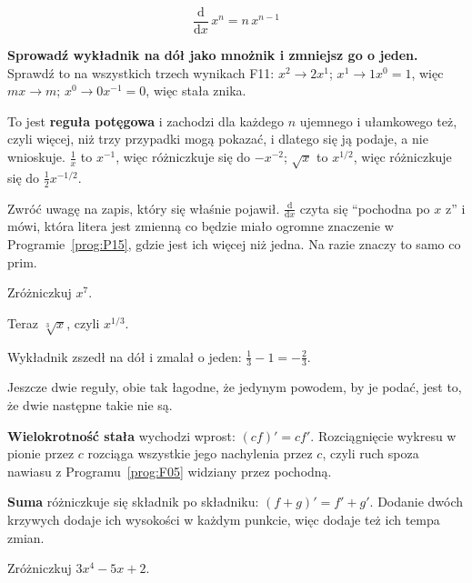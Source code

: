 \begin{fr}
\begin{ansblock}
\[ \frac{\mathrm{d}}{\mathrm{d}x}\,x^{n} = n\,x^{n-1} \]
\end{ansblock}

\textbf{Sprowadź wykładnik na dół jako mnożnik i zmniejsz go o jeden.}
Sprawdź to na wszystkich trzech wynikach F11: $x^{2} \to 2x^{1}$;
$x^{1} \to 1x^{0} = 1$, więc $mx \to m$; $x^{0} \to 0x^{-1} = 0$, więc stała
znika.

To jest \textbf{reguła potęgowa} i zachodzi dla każdego $n$ \dash{} ujemnego i
ułamkowego też, czyli więcej, niż trzy przypadki mogą pokazać, i dlatego się
ją podaje, a nie wnioskuje. $\frac{1}{x}$ to $x^{-1}$, więc różniczkuje się do
$-x^{-2}$; $\sqrt{x}$ to $x^{1/2}$, więc różniczkuje się do
$\frac{1}{2}x^{-1/2}$.

Zwróć uwagę na zapis, który się właśnie pojawił.
$\frac{\mathrm{d}}{\mathrm{d}x}$ czyta się \enquote{pochodna po $x$ z} i mówi,
która litera jest zmienną \dash{} co będzie miało ogromne znaczenie w
Programie~\ref{prog:P15}, gdzie jest ich więcej niż jedna. Na razie znaczy to
samo co prim.

Zróżniczkuj $x^{7}$.
\nextframe
\end{fr}

\begin{fr}
Teraz $\sqrt[3]{x}$, czyli $x^{1/3}$.
\nextframe
\end{fr}

\begin{fr}
Wykładnik zszedł na dół i zmalał o jeden: $\frac{1}{3} - 1 = -\frac{2}{3}$.

Jeszcze dwie reguły, obie tak łagodne, że jedynym powodem, by je podać, jest
to, że dwie następne takie nie są.

\textbf{Wielokrotność stała} wychodzi wprost: $(cf)' = c f'$. Rozciągnięcie
wykresu w pionie przez $c$ rozciąga wszystkie jego nachylenia przez $c$, czyli
ruch spoza nawiasu z Programu~\ref{prog:F05} widziany przez pochodną.

\textbf{Suma} różniczkuje się składnik po składniku: $(f + g)' = f' + g'$.
Dodanie dwóch krzywych dodaje ich wysokości w każdym punkcie, więc dodaje też
ich tempa zmian.

Zróżniczkuj $3x^{4} - 5x + 2$.
\nextframe
\end{fr}

